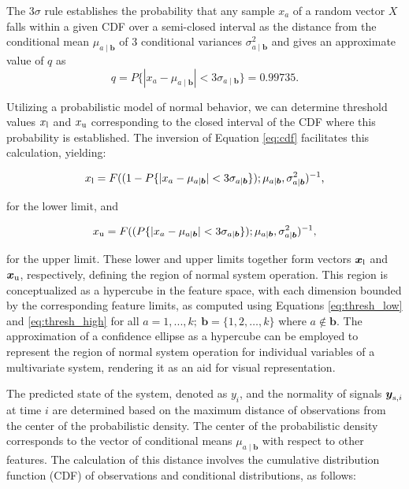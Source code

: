 The \(3\sigma\) rule establishes the probability that any sample \(x_a\) of a random vector \({X}\) falls within a given CDF over a semi-closed interval as the distance from the conditional mean \(\mu_{a \mid \boldsymbol{b}} \) of 3 conditional variances \(\sigma_{a \mid \boldsymbol{b}}^2\) and gives an approximate value of $q$ as
\begin{equation}
  q=P\{|x_a-\mu_{a \mid \boldsymbol{b}} |<3\sigma_{a \mid \boldsymbol{b}}\}=0.99735
  \text{.}\label{eq:q}
\end{equation}

Utilizing a probabilistic model of normal behavior, we can determine threshold values ${x _{\text{l}}}$ and ${x _{\text{u}}}$ corresponding to the closed interval of the CDF where this probability is established. The inversion of Equation \eqref{eq:cdf} facilitates this calculation, yielding:

\begin{equation}
  {x _{\text{l}}} = F((1 - P\{|x_a-\mu_{a \mid \boldsymbol{b}}|<3\sigma_{a \mid \boldsymbol{b}}\}); \mu_{a \mid \boldsymbol{b}}, \sigma_{a \mid \boldsymbol{b}}^2)^{-1}\text{,}\label{eq:thresh_low}
\end{equation}

for the lower limit, and

\begin{equation}
  {x _{\text{u}}} = F((P\{|x_a-\mu_{a \mid \boldsymbol{b}}|<3\sigma_{a \mid \boldsymbol{b}}\}); \mu_{a \mid \boldsymbol{b}}, \sigma_{a \mid \boldsymbol{b}}^2)^{-1}\text{,}\label{eq:thresh_high}
\end{equation}

for the upper limit. These lower and upper limits together form vectors $\boldsymbol{x _{\text{l}}}$ and $\boldsymbol{x _{\text{u}}}$, respectively, defining the region of normal system operation. This region is conceptualized as a hypercube in the feature space, with each dimension bounded by the corresponding feature limits, as computed using Equations \eqref{eq:thresh_low} and \eqref{eq:thresh_high} for all $a = 1,...,k;~ \boldsymbol{b} = \{1, 2, \ldots, k\}$ where $a \notin \boldsymbol{b}$. The approximation of a confidence ellipse as a hypercube can be employed to represent the region of normal system operation for individual variables of a multivariate system, rendering it as an aid for visual representation.

The predicted state of the system, denoted as $y_i$, and the normality of signals $\boldsymbol{y} _{\text{s}, i}$ at time $i$ are determined based on the maximum distance of observations from the center of the probabilistic density. The center of the probabilistic density corresponds to the vector of conditional means $\mu_{a \mid \boldsymbol{b}}$ with respect to other features. The calculation of this distance involves the cumulative distribution function (CDF) of observations and conditional distributions, as  follows:

